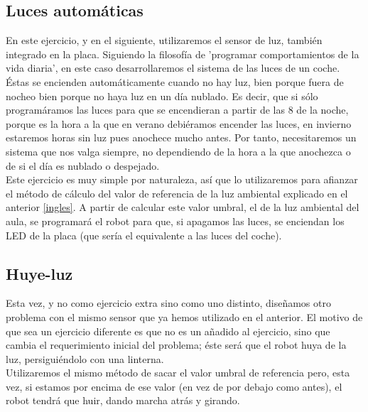 \subsection{Luces automáticas}
En este ejercicio, y en el siguiente, utilizaremos el sensor de luz, también integrado en la placa. Siguiendo la filosofía de 'programar comportamientos de la vida diaria', en este caso desarrollaremos el sistema de las luces de un coche. Éstas se encienden automáticamente cuando no hay luz, bien porque fuera de nocheo bien porque no haya luz en un día nublado. Es decir, que si sólo programáramos las luces para que se encendieran a partir de las 8 de la noche, porque es la hora a la que en verano debiéramos encender las luces, en invierno estaremos horas sin luz pues anochece mucho antes. Por tanto, necesitaremos un sistema que nos valga siempre, no dependiendo de la hora a la que anochezca o de si el día es nublado o despejado. \\
Este ejercicio es muy simple por naturaleza, así que lo utilizaremos para afianzar el método de cálculo del valor de referencia de la luz ambiental explicado en el anterior \ref{ingles}. A partir de calcular este valor umbral, el de la luz ambiental del aula, se programará el robot para que, si apagamos las luces, se enciendan los LED de la placa (que sería el equivalente a las luces del coche).\\

\subsection{Huye-luz}
Esta vez, y no como ejercicio extra sino como uno distinto, diseñamos otro problema con el mismo sensor que ya hemos utilizado en el anterior. El motivo de que sea un ejercicio diferente es que no es un añadido al ejercicio, sino que cambia el requerimiento inicial del problema; éste será que el robot huya de la luz, persiguiéndolo con una linterna.\\
Utilizaremos el mismo método de sacar el valor umbral de referencia pero, esta vez, si estamos por encima de ese valor (en vez de por debajo como antes), el robot tendrá que huir, dando marcha atrás y girando.\\


